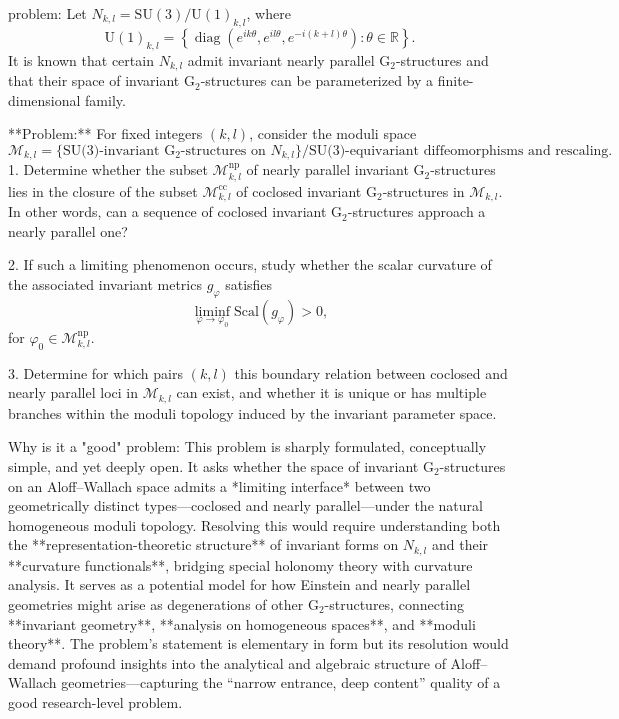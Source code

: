 problem:  
Let \( N_{k,l} = \mathrm{SU}(3)/\mathrm{U}(1)_{k,l} \), where  
\[
\mathrm{U}(1)_{k,l}=\left\{\operatorname{diag}(e^{ik\theta}, e^{il\theta}, e^{-i(k+l)\theta}) : \theta\in \mathbb{R}\right\}.
\]  
It is known that certain \(N_{k,l}\) admit invariant nearly parallel \(\mathrm{G}_2\)-structures and that their space of invariant \(\mathrm{G}_2\)-structures can be parameterized by a finite-dimensional family.

**Problem:**  
For fixed integers \((k,l)\), consider the moduli space  
\[
\mathcal{M}_{k,l} = \{ \text{SU(3)-invariant } \mathrm{G}_2\text{-structures on } N_{k,l}\} / \text{SU(3)-equivariant diffeomorphisms and rescaling}.
\]
1. Determine whether the subset \(\mathcal{M}_{k,l}^{\text{np}}\) of nearly parallel invariant \(\mathrm{G}_2\)-structures lies in the closure of the subset \(\mathcal{M}_{k,l}^{\text{cc}}\) of coclosed invariant \(\mathrm{G}_2\)-structures in \(\mathcal{M}_{k,l}\). In other words, can a sequence of coclosed invariant \(\mathrm{G}_2\)-structures approach a nearly parallel one?  

2. If such a limiting phenomenon occurs, study whether the scalar curvature of the associated invariant metrics \(g_\varphi\) satisfies  
\[
\liminf_{\varphi\to\varphi_0} \mathrm{Scal}(g_\varphi) > 0,
\]
for \(\varphi_0 \in \mathcal{M}_{k,l}^{\text{np}}\).  

3. Determine for which pairs \((k,l)\) this boundary relation between coclosed and nearly parallel loci in \(\mathcal{M}_{k,l}\) can exist, and whether it is unique or has multiple branches within the moduli topology induced by the invariant parameter space.

Why is it a "good" problem:  
This problem is sharply formulated, conceptually simple, and yet deeply open. It asks whether the space of invariant \(\mathrm{G}_2\)-structures on an Aloff–Wallach space admits a *limiting interface* between two geometrically distinct types—coclosed and nearly parallel—under the natural homogeneous moduli topology. Resolving this would require understanding both the **representation-theoretic structure** of invariant forms on \(N_{k,l}\) and their **curvature functionals**, bridging special holonomy theory with curvature analysis. It serves as a potential model for how Einstein and nearly parallel geometries might arise as degenerations of other \(\mathrm{G}_2\)-structures, connecting **invariant geometry**, **analysis on homogeneous spaces**, and **moduli theory**. The problem’s statement is elementary in form but its resolution would demand profound insights into the analytical and algebraic structure of Aloff–Wallach geometries—capturing the “narrow entrance, deep content” quality of a good research-level problem.